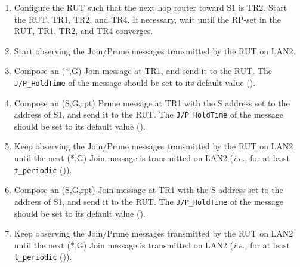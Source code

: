 \documentclass[11pt]{report}
\newcommand{\ie}{\emph{i.e.,}\xspace}
\begin{document}

\begin{enumerate}

  \item Configure the RUT such that the next hop router toward S1 is
  TR2. Start the RUT, TR1, TR2, and TR4. If necessary, wait until the
  RP-set in the RUT, TR1, TR2, and TR4 converges.

  \item Start observing the Join/Prune messages transmitted by the RUT on
  LAN2.

  \item Compose an (*,G) Join message at TR1, and send it to the RUT. 
  The \verb=J/P_HoldTime= of the message should be set to its default
  value ({\PimsmJPHoldTime}).

  \item Compose an (S,G,rpt) Prune message at TR1 with the S address set to the
  address of S1, and send it to the RUT. 
  The \verb=J/P_HoldTime= of the message should be set to its default
  value ({\PimsmJPHoldTime}).

  \item Keep observing the Join/Prune messages transmitted by the
  RUT on LAN2 until the next (*,G) Join message is transmitted on
  LAN2 (\ie for at least \verb=t_periodic= ({\PimsmTPeriodic})).

  \item Compose an (S,G,rpt) Join message at TR1 with the S address set to the
  address of S1, and send it to the RUT. 
  The \verb=J/P_HoldTime= of the message should be set to its default
  value ({\PimsmJPHoldTime}).

  \item Keep observing the Join/Prune messages transmitted by the
  RUT on LAN2 until the next (*,G) Join message is transmitted on
  LAN2 (\ie for at least \verb=t_periodic= ({\PimsmTPeriodic})).

\end{enumerate}

\end{document}
